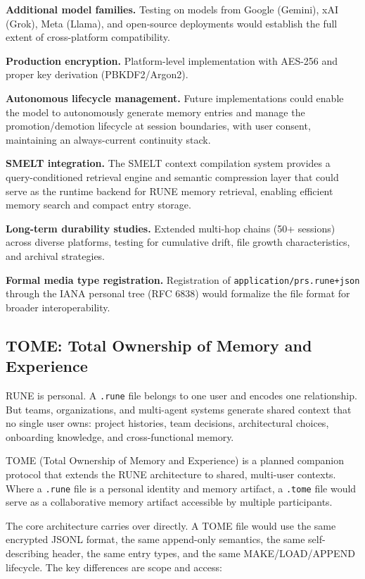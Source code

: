 \documentclass[11pt,a4paper]{article}
\begin{document}
\textbf{Additional model families.} Testing on models from Google (Gemini), xAI (Grok), Meta (Llama), and open-source deployments would establish the full extent of cross-platform compatibility.

\textbf{Production encryption.} Platform-level implementation with AES-256 and proper key derivation (PBKDF2/Argon2).

\textbf{Autonomous lifecycle management.} Future implementations could enable the model to autonomously generate memory entries and manage the promotion/demotion lifecycle at session boundaries, with user consent, maintaining an always-current continuity stack.

\textbf{SMELT integration.} The SMELT context compilation system \citep{lister2026smelt} provides a query-conditioned retrieval engine and semantic compression layer that could serve as the runtime backend for RUNE memory retrieval, enabling efficient memory search and compact entry storage.

\textbf{Long-term durability studies.} Extended multi-hop chains (50+ sessions) across diverse platforms, testing for cumulative drift, file growth characteristics, and archival strategies.

\textbf{Formal media type registration.} Registration of \texttt{application/prs.rune+json} through the IANA personal tree (RFC 6838) would formalize the file format for broader interoperability.

\subsection{TOME: Total Ownership of Memory and Experience}

RUNE is personal. A \texttt{.rune} file belongs to one user and encodes one relationship. But teams, organizations, and multi-agent systems generate shared context that no single user owns: project histories, team decisions, architectural choices, onboarding knowledge, and cross-functional memory.

TOME (Total Ownership of Memory and Experience) is a planned companion protocol that extends the RUNE architecture to shared, multi-user contexts. Where a \texttt{.rune} file is a personal identity and memory artifact, a \texttt{.tome} file would serve as a collaborative memory artifact accessible by multiple participants.

The core architecture carries over directly. A TOME file would use the same encrypted JSONL format, the same append-only semantics, the same self-describing header, the same entry types, and the same MAKE/LOAD/APPEND lifecycle. The key differences are scope and access:
\end{document}

